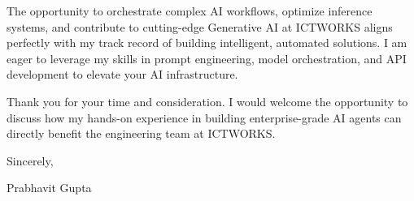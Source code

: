 \documentclass[11pt,a4paper]{article}
\begin{document}
The opportunity to orchestrate complex AI workflows, optimize inference systems, and contribute to cutting-edge Generative AI at ICTWORKS aligns perfectly with my track record of building intelligent, automated solutions. I am eager to leverage my skills in prompt engineering, model orchestration, and API development to elevate your AI infrastructure.

Thank you for your time and consideration. I would welcome the opportunity to discuss how my hands-on experience in building enterprise-grade AI agents can directly benefit the engineering team at ICTWORKS.

\vspace{10pt}

Sincerely,

\vspace{10pt}

Prabhavit Gupta
\end{document}
